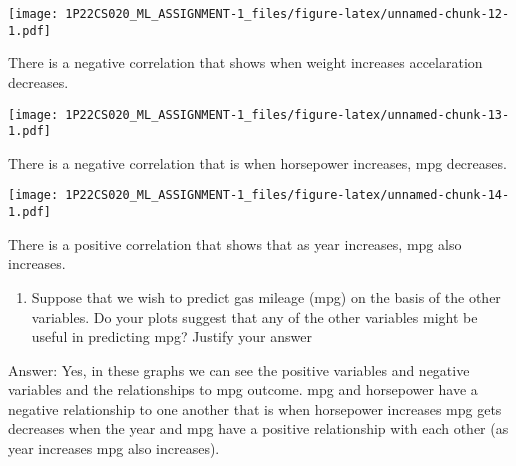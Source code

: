 \documentclass[
]{article}
\newenvironment{Shaded}{\begin{snugshade}}{\end{snugshade}}
\newcommand{\FunctionTok}[1]{\textcolor[rgb]{0.13,0.29,0.53}{\textbf{#1}}}
\newcommand{\NormalTok}[1]{#1}
\newcommand{\SpecialCharTok}[1]{\textcolor[rgb]{0.81,0.36,0.00}{\textbf{#1}}}
\providecommand{\tightlist}{%
  \setlength{\itemsep}{0pt}\setlength{\parskip}{0pt}}
\begin{document}
\begin{Shaded}
\end{Shaded}

\texttt{[image: 1P22CS020\_ML\_ASSIGNMENT-1\_files/figure-latex/unnamed-chunk-12-1.pdf]}

There is a negative correlation that shows when weight increases
accelaration decreases.

\begin{Shaded}
\end{Shaded}

\texttt{[image: 1P22CS020\_ML\_ASSIGNMENT-1\_files/figure-latex/unnamed-chunk-13-1.pdf]}

There is a negative correlation that is when horsepower increases, mpg
decreases.

\begin{Shaded}
\end{Shaded}

\texttt{[image: 1P22CS020\_ML\_ASSIGNMENT-1\_files/figure-latex/unnamed-chunk-14-1.pdf]}

There is a positive correlation that shows that as year increases, mpg
also increases.

\begin{enumerate}
\def\labelenumi{(\alph{enumi})}
\setcounter{enumi}{5}
\tightlist
\item
  Suppose that we wish to predict gas mileage (mpg) on the basis of the
  other variables. Do your plots suggest that any of the other variables
  might be useful in predicting mpg? Justify your answer
\end{enumerate}

Answer: Yes, in these graphs we can see the positive variables and
negative variables and the relationships to mpg outcome. mpg and
horsepower have a negative relationship to one another that is when
horsepower increases mpg gets decreases when the year and mpg have a
positive relationship with each other (as year increases mpg also
increases).
\end{document}
